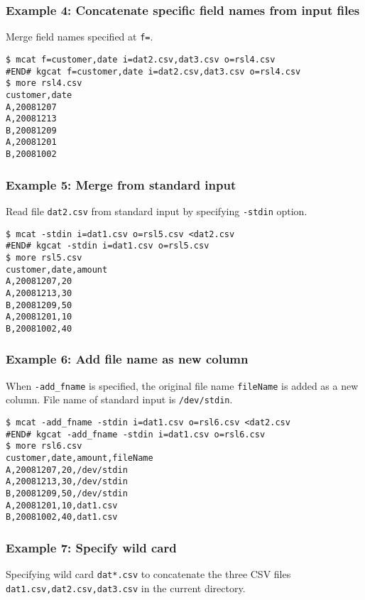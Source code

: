 \subsubsection*{Example 4: Concatenate specific field names from input files}

Merge field names specified at \verb|f=|.


\begin{Verbatim}[baselinestretch=0.7,frame=single]
$ mcat f=customer,date i=dat2.csv,dat3.csv o=rsl4.csv
#END# kgcat f=customer,date i=dat2.csv,dat3.csv o=rsl4.csv
$ more rsl4.csv
customer,date
A,20081207
A,20081213
B,20081209
A,20081201
B,20081002
\end{Verbatim}
\subsubsection*{Example 5: Merge from standard input}

Read file \verb|dat2.csv| from standard input by specifying \verb|-stdin| option.



\begin{Verbatim}[baselinestretch=0.7,frame=single]
$ mcat -stdin i=dat1.csv o=rsl5.csv <dat2.csv
#END# kgcat -stdin i=dat1.csv o=rsl5.csv
$ more rsl5.csv
customer,date,amount
A,20081207,20
A,20081213,30
B,20081209,50
A,20081201,10
B,20081002,40
\end{Verbatim}
\subsubsection*{Example 6: Add file name as new column}

When \verb|-add_fname| is specified, the original file name \verb|fileName| is added as a new column.
File name of standard input is \verb|/dev/stdin|.


\begin{Verbatim}[baselinestretch=0.7,frame=single]
$ mcat -add_fname -stdin i=dat1.csv o=rsl6.csv <dat2.csv
#END# kgcat -add_fname -stdin i=dat1.csv o=rsl6.csv
$ more rsl6.csv
customer,date,amount,fileName
A,20081207,20,/dev/stdin
A,20081213,30,/dev/stdin
B,20081209,50,/dev/stdin
A,20081201,10,dat1.csv
B,20081002,40,dat1.csv
\end{Verbatim}
\subsubsection*{Example 7: Specify wild card}

Specifying wild card \verb|dat*.csv| to concatenate the three CSV files \verb|dat1.csv,dat2.csv,dat3.csv| in the current directory.


